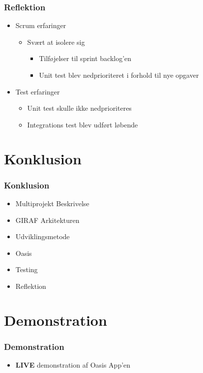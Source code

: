 \documentclass{beamer}
\begin{document}
\begin{frame}
	\frametitle{Reflektion}
	\begin{itemize}
		\item Scrum erfaringer
		\begin{itemize}
			\item Sv\ae{}rt at isolere sig
			\begin{itemize}
				\item Tilf\o{}jelser til sprint backlog'en
				\item Unit test blev nedprioriteret i forhold til nye opgaver
			\end{itemize}
		\end{itemize}
		\item Test erfaringer
		\begin{itemize}
			\item Unit test skulle ikke nedprioriteres
			\item Integrations test blev udf\o{}rt l\o{}bende
		\end{itemize}
		
	\end{itemize}
\end{frame}

\section{Konklusion}

\begin{frame}
	\frametitle{Konklusion}
	\begin{itemize}
		\item Multiprojekt Beskrivelse
		\item GIRAF Arkitekturen
		\item Udviklingsmetode
		\item Oasis
		\item Testing
		\item Reflektion
	\end{itemize}
\end{frame}

\section{Demonstration}

\begin{frame}
	\frametitle{Demonstration}
	\begin{itemize}
		\item \textbf{LIVE} demonstration af Oasis App'en
	\end{itemize}
\end{frame}
\end{document}
